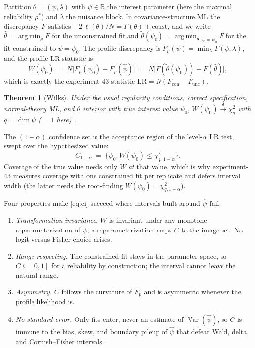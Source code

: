 \documentclass[11pt]{article}
\newcommand{\Var}{\operatorname{Var}}
\newcommand{\argmin}{\operatorname*{arg\,min}}
\theoremstyle{plain}
\newtheorem{theorem}{Theorem}
\theoremstyle{remark}
\begin{document}
Partition $\theta = (\psi, \lambda)$ with $\psi \in \mathbb{R}$ the interest
parameter (here the maximal reliability $\rho^*$) and $\lambda$ the nuisance
block. In covariance-structure ML the discrepancy $F$ satisfies
$-2\,\ell(\theta)/N = F(\theta) + \text{const}$, and we write
$\hat\theta = \argmin_\theta F$ for the unconstrained fit and
$\tilde\theta(\psi_0) = \argmin_{\theta:\,\psi=\psi_0} F$ for the fit constrained
to $\psi = \psi_0$. The profile discrepancy is
$F_p(\psi) = \min_\lambda F(\psi,\lambda)$, and the profile LR statistic is
%
\begin{equation}
\label{eq:lr}
W(\psi_0) \;=\; N\big[F_p(\psi_0) - F_p(\hat\psi)\big]
          \;=\; N\big[F(\tilde\theta(\psi_0)) - F(\hat\theta)\big],
\end{equation}
%
which is exactly the experiment-43 statistic $\mathrm{LR} = N(F_{\mathrm{con}} -
F_{\mathrm{unc}})$.

\begin{theorem}[Wilks]
\label{thm:wilks}
Under the usual regularity conditions, correct specification, normal-theory ML,
and $\theta$ interior with true interest value $\psi_0$,
$W(\psi_0) \xrightarrow{d} \chi^2_q$ with $q = \dim\psi$ ($=1$ here)
\cite{wilks1938}.
\end{theorem}

The $(1-\alpha)$ confidence set is the acceptance region of the level-$\alpha$ LR
test, swept over the hypothesized value:
%
\begin{equation}
\label{eq:ci}
C_{1-\alpha} \;=\; \big\{\psi_0 : W(\psi_0) \le \chi^2_{q,\,1-\alpha}\big\}.
\end{equation}
%
Coverage of the true value needs only $W$ \emph{at} that value, which is why
experiment-43 measures coverage with one constrained fit per replicate and defers
interval width (the latter needs the root-finding $W(\psi_0) = \chi^2_{q,1-\alpha}$).

Four properties make \eqref{eq:ci} succeed where intervals built around
$\hat\psi$ fail.
\begin{enumerate}
\item[(i)] \emph{Transformation-invariance.} $W$ is invariant under any monotone
reparameterization of $\psi$; a reparameterization maps $C$ to the image set. No
logit-versus-Fisher choice arises.
\item[(ii)] \emph{Range-respecting.} The constrained fit stays in the parameter
space, so $C \subseteq [0,1]$ for a reliability by construction; the interval
cannot leave the natural range.
\item[(iii)] \emph{Asymmetry.} $C$ follows the curvature of $F_p$ and is
asymmetric whenever the profile likelihood is.
\item[(iv)] \emph{No standard error.} Only fits enter, never an estimate of
$\Var(\hat\psi)$, so $C$ is immune to the bias, skew, and boundary pileup of
$\hat\psi$ that defeat Wald, delta, and Cornish--Fisher intervals.
\end{enumerate}
\end{document}
